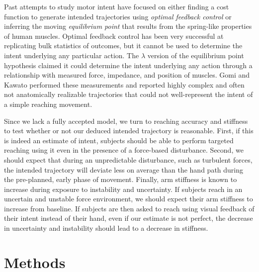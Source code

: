 \documentclass[letterpaper, 10 pt, conference]{ieeeconf}  %
\begin{document}
Past attempts to study motor intent have focused on either finding a cost function to generate intended trajectories using \textit{optimal feedback control} or inferring the moving \textit{equilibrium point} that results from the spring-like properties of human muscles. Optimal feedback control has been very successful at replicating bulk statistics of outcomes, but it cannot be used to determine the intent underlying any particular action\cite{todorov2002optimal}. The $\lambda$ version of the equilibrium point hypothesis claimed it could determine the intent underlying any action through a relationship with measured force, impedance, and position of muscles\cite{feldman1995origin}. Gomi and Kawato\cite{gomi1997human} performed these measurements and reported highly complex and often not anatomically realizable trajectories that could not well-represent the intent of a simple reaching movement.

Since we lack a fully accepted model, we turn to reaching accuracy and stiffness to test whether or not our deduced intended trajectory is reasonable. First, if this is indeed an estimate of intent, subjects should be able to perform targeted reaching using it even in the presence of a force-based disturbance. Second, we should expect that during an unpredictable disturbance, such as turbulent forces, the intended trajectory will deviate less on average than the hand path during the pre-planned, early phase of movement. Finally, arm stiffness is known to increase during exposure to instability\cite{franklin2003adaptation} and uncertainty\cite{takahashi2001impedance}. If subjects reach in an uncertain and unstable force environment, we should expect their arm stiffness to increase from baseline. If subjects are then asked to reach using visual feedback of their intent instead of their hand, even if our estimate is not perfect, the decrease in uncertainty and instability should lead to a decrease in stiffness.

\section{Methods}
\end{document}
